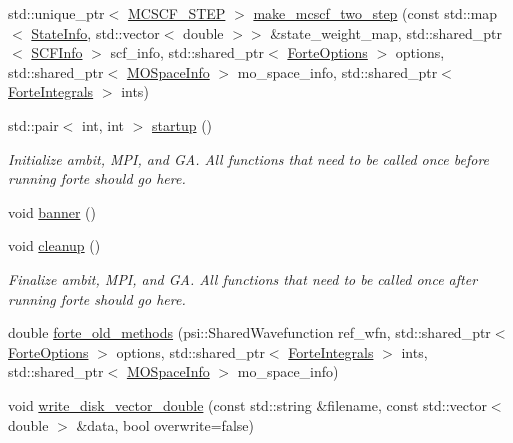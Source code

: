 \begin{DoxyCompactItemize}
\item 
std\+::unique\+\_\+ptr$<$ \mbox{\hyperlink{classforte_1_1_m_c_s_c_f__2_s_t_e_p}{M\+C\+S\+C\+F\+\_\+S\+T\+EP}} $>$ \mbox{\hyperlink{namespaceforte_afe2e464351f0b9e7657744e5c9292592}{make\+\_\+mcscf\+\_\+two\+\_\+step}} (const std\+::map$<$ \mbox{\hyperlink{classforte_1_1_state_info}{State\+Info}}, std\+::vector$<$ double $>$$>$ \&state\+\_\+weight\+\_\+map, std\+::shared\+\_\+ptr$<$ \mbox{\hyperlink{classforte_1_1_s_c_f_info}{S\+C\+F\+Info}} $>$ scf\+\_\+info, std\+::shared\+\_\+ptr$<$ \mbox{\hyperlink{classforte_1_1_forte_options}{Forte\+Options}} $>$ options, std\+::shared\+\_\+ptr$<$ \mbox{\hyperlink{classforte_1_1_m_o_space_info}{M\+O\+Space\+Info}} $>$ mo\+\_\+space\+\_\+info, std\+::shared\+\_\+ptr$<$ \mbox{\hyperlink{classforte_1_1_forte_integrals}{Forte\+Integrals}} $>$ ints)
\item 
std\+::pair$<$ int, int $>$ \mbox{\hyperlink{namespaceforte_ae163b241b552cdfa999f49c3c21ae7f8}{startup}} ()
\begin{DoxyCompactList}\small\item\em Initialize ambit, M\+PI, and GA. All functions that need to be called once before running forte should go here. \end{DoxyCompactList}\item 
void \mbox{\hyperlink{namespaceforte_af3564424365af8f2e05e951efa907565}{banner}} ()
\item 
void \mbox{\hyperlink{namespaceforte_a39f3331bc7d13194f570cf4c712380f7}{cleanup}} ()
\begin{DoxyCompactList}\small\item\em Finalize ambit, M\+PI, and GA. All functions that need to be called once after running forte should go here. \end{DoxyCompactList}\item 
double \mbox{\hyperlink{namespaceforte_ad5e8940089c79e6aef5bce96770741c3}{forte\+\_\+old\+\_\+methods}} (psi\+::\+Shared\+Wavefunction ref\+\_\+wfn, std\+::shared\+\_\+ptr$<$ \mbox{\hyperlink{classforte_1_1_forte_options}{Forte\+Options}} $>$ options, std\+::shared\+\_\+ptr$<$ \mbox{\hyperlink{classforte_1_1_forte_integrals}{Forte\+Integrals}} $>$ ints, std\+::shared\+\_\+ptr$<$ \mbox{\hyperlink{classforte_1_1_m_o_space_info}{M\+O\+Space\+Info}} $>$ mo\+\_\+space\+\_\+info)
\item 
void \mbox{\hyperlink{namespaceforte_a9a44938bf4a0b18941d672c803c4cd44}{write\+\_\+disk\+\_\+vector\+\_\+double}} (const std\+::string \&filename, const std\+::vector$<$ double $>$ \&data, bool overwrite=false)
$$
\end{DoxyCompactItemize}
